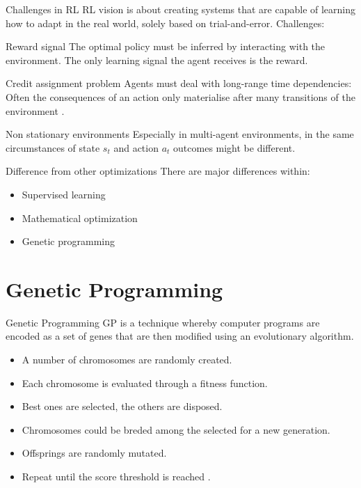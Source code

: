 \documentclass[aspectratio=169]{beamer}
\begin{document}
\begin{frame}{Challenges in RL}
	RL  vision  is about creating  systems that  are  capable  of  learning  how  to  adapt  in  the  real  world, solely based on trial-and-error.	
	Challenges:
	\begin{alertblock}{Reward signal}
	The  optimal  policy  must  be  inferred  by  interacting with the environment. The only learning signal
the agent receives is the reward.
	\end{alertblock}
	\begin{alertblock}{Credit assignment problem}
	Agents  must  deal  with  long-range  time  dependencies:
Often the consequences of an action only materialise after
many transitions of the environment \cite{Montague1999}.
	\end{alertblock}
	\begin{alertblock}{Non stationary environments}
	Especially in multi-agent environments, in the same circumstances of state $s_t$ and action $a_t$ outcomes might be different.
	\end{alertblock}

\end{frame}

\begin{frame}[fragile]{Difference from other optimizations}
	There are major differences within:
  \begin{itemize}[<+- | alert@+>]
    \item {Supervised learning}
	\item Mathematical optimization
	\item Genetic programming
  \end{itemize}
\end{frame}

\section{Genetic Programming}
\begin{frame}{Genetic Programming}
	\textsc{GP} is a technique whereby computer programs are encoded as a set of genes that are then modified using an evolutionary algorithm.
	\begin{itemize}
		\item A number of chromosomes are randomly created.
		\item Each chromosome is evaluated through a fitness function.
		\item Best ones are selected, the others are disposed.
		\item Chromosomes could be breded among the selected for a new generation.
		\item Offsprings are randomly mutated.
		\item Repeat until the score threshold is reached \cite{gf-gp}.
	\end{itemize}
\end{frame}
\end{document}
